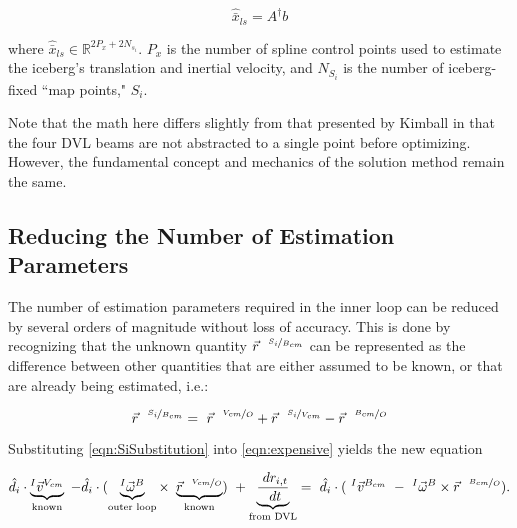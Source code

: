 \begin{equation}
    \hat{\bar{x}}_{ls} = A^{\dagger} b
    \label{eqn:LeastSquares}
\end{equation}

where $\hat{\bar{x}}_{ls}  \in \mathbb{R}^{ 2P_x + 2N_{s_i}}$. $P_x$ is the number of spline control points used to estimate the iceberg's translation and inertial velocity, and $N_{S_i}$ is the number of iceberg-fixed ``map points," $S_i$.


Note that the math here differs slightly from that presented by Kimball in that the four DVL beams are not abstracted to a single point before optimizing. However, the fundamental concept and mechanics of the solution method remain the same.



\subsection{Reducing the Number of Estimation Parameters}


The number of estimation parameters required in the inner loop can be reduced by several orders of magnitude without loss of accuracy. This is done by recognizing that the unknown quantity $\vec{r}^{~~\nicefrac{S_i}{B_{cm}}}$ can be represented as the difference between other quantities that are either assumed to be known, or that are already being estimated, i.e.:

\begin{equation}
    \label{eqn:SiSubstitution}
    \vec{r}^{~~\nicefrac{S_i}{B_{cm}}}  = ~\vec{r}^{~~\nicefrac{V_{cm}}{O}} + \vec{r}^{~~\nicefrac{S_i}{V_{cm}}} - \vec{r}^{~~\nicefrac{B_{cm}}{O}}
\end{equation}

Substituting \ref{eqn:SiSubstitution} into \ref{eqn:expensive} yields the new equation

     \begin{equation}
 \hat{d}_i\cdot\underbrace{^{I}\vec{v}^{V_{cm}}}_\text{known} ~-
  \hat{d}_i\cdot(\underbrace{^{I}\vec{\omega}^{B}}_{\text{outer loop}}\times~\underbrace{\vec{r}^{~~\nicefrac{V_{cm}}{O}}}_\text{known}) ~+
 \underbrace{ \frac{~dr_{i,t}}{~dt}}_{\text{from DVL}}  
  =~\hat{d}_i\cdot(~^{I}\vec{v}^{B_{cm}} ~-
 ~^{I}\vec{\omega}^{B}\times\vec{r}^{~~\nicefrac{B_{cm}}{O}}).
 \label{eqn:getIt}
\end{equation}

